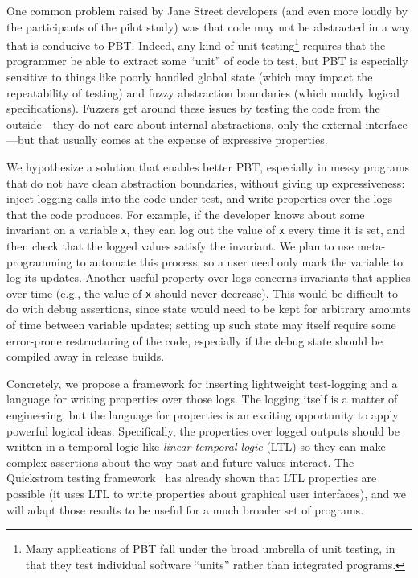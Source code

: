 One common problem raised by Jane Street developers (and even more loudly by the
participants of the pilot study) was
that code may not be abstracted
in a way that is conducive to PBT. Indeed, any kind of unit
testing\footnote{Many applications of PBT fall under the broad umbrella of unit
testing, in that they test individual software ``units'' rather than integrated
programs.} requires
that the programmer be able to extract some ``unit'' of code to test, but PBT is
especially sensitive to things like poorly handled global state (which may
impact the repeatability of testing) and fuzzy
abstraction boundaries (which muddy logical specifications). Fuzzers  get around these issues by
testing the code from the outside---they do not care about internal
abstractions, only the external interface---but that usually comes at the
expense of expressive properties.

We hypothesize a solution that enables better PBT,
especially in messy programs that do not have clean abstraction boundaries,
without giving
up expressiveness: inject logging calls into the code under test, and write
properties over the logs that the code produces. For example, if the developer
knows about some invariant on a variable \lstinline{x}, they can log out the
value of \lstinline{x} every time it is set, and then check that the logged
values satisfy the invariant. We plan to use meta-programming to automate this
process, so a user need only mark the variable to log its updates. Another
useful property over logs concerns
invariants that applies over time (e.g., the value of \lstinline{x} should
never decrease).
This would be difficult to do with debug assertions, since state would need to
be kept for arbitrary amounts of time between variable updates; setting up such
state may itself require some error-prone restructuring of the code, especially
if the debug state should be compiled away in release builds.

Concretely, we propose a framework for inserting lightweight test-logging and a
language for writing properties over those logs. The logging itself is a matter
of engineering, but the language for properties is an exciting opportunity to
apply powerful logical ideas. Specifically, the properties over logged outputs
should be written in a temporal logic like {\em linear temporal logic} (LTL) so
they can make complex assertions about the way past and future values interact.
The Quickstrom testing framework~\cite{oconnor_quickstrom_2022} has already shown that
LTL properties are possible (it uses LTL to write properties about graphical
user interfaces), and we will adapt those results to be useful for a much
broader set of programs.

